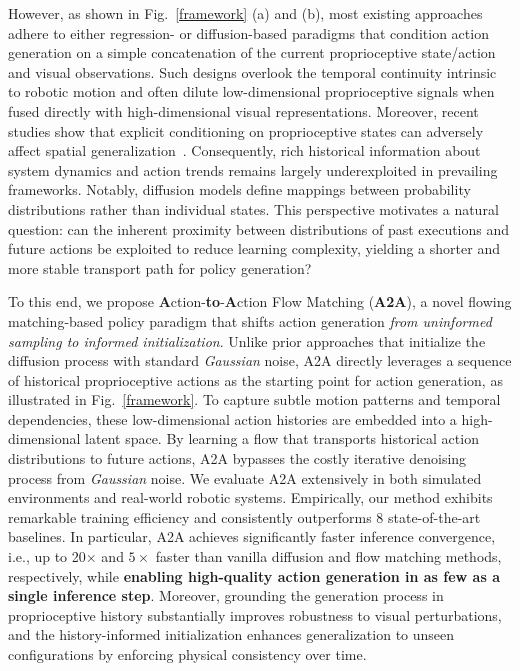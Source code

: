 \documentclass[onecolumn]{fairmeta}
\newcommand{\m}[1]{{A2A}}
\begin{document}
However, as shown in Fig.~\ref{framework} (a) and (b), most existing approaches adhere to either regression- or diffusion-based paradigms that condition action generation on a simple concatenation of the current proprioceptive state/action and visual observations. Such designs overlook the temporal continuity intrinsic to robotic motion and often dilute low-dimensional proprioceptive signals when fused directly with high-dimensional visual representations. Moreover, recent studies show that explicit conditioning on proprioceptive states can adversely affect spatial generalization~\citep{zhao2025you}.
Consequently, rich historical information about system dynamics and action trends remains largely underexploited in prevailing frameworks. Notably, diffusion models define mappings between probability distributions rather than individual states. This perspective motivates a natural question: can the inherent proximity between distributions of past executions and future actions be exploited to reduce learning complexity, yielding a shorter and more stable transport path for policy generation?


To this end, we propose \textbf{A}ction-\textbf{to}-\textbf{A}ction {Flow} Matching (\textbf{\m{}}), a novel flowing matching-based policy paradigm that shifts action generation \textit{from uninformed sampling to informed initialization}. Unlike prior approaches that initialize the diffusion process with standard \textit{Gaussian} noise, \m{} directly leverages a sequence of historical proprioceptive actions as the starting point for action generation, as illustrated in Fig.~\ref{framework}. To capture subtle motion patterns and temporal dependencies, these low-dimensional action histories are embedded into a high-dimensional latent space. By learning a flow that transports historical action distributions to future actions, \m{} bypasses the costly iterative denoising process from \textit{Gaussian} noise.
We evaluate \m{} extensively in both simulated environments and real-world robotic systems. Empirically, our method exhibits remarkable training efficiency and consistently outperforms 8 state-of-the-art baselines.
In particular, \m{} achieves significantly faster inference convergence, i.e., up to 20$\times$ and $5\times$ faster than vanilla diffusion and flow matching methods, respectively, while \textbf{enabling high-quality action generation in as few as a single inference step}. 
Moreover, grounding the generation process in proprioceptive history substantially improves robustness to visual perturbations, and the history-informed initialization enhances generalization to unseen configurations by enforcing physical consistency over time.
\end{document}
